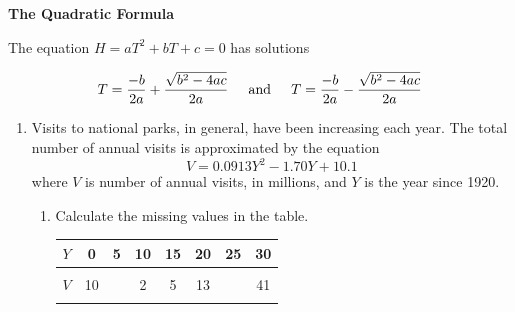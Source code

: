 \documentclass[11pt]{article}
\begin{document}
 \vspace{.2in}
 
 \begin{center}
\textbf{The Quadratic Formula}
\vspace{.1in}

The equation $H=aT^2+bT+c=0$ has solutions 


$$\displaystyle T=\frac{-b}{2a} + \frac{\sqrt{b^2-4ac}}{2a} \hspace{.2in} \text{and} \hspace{.2in}T=\frac{-b}{2a} - \frac{\sqrt{b^2-4ac}}{2a}$$

 \end{center}
\hrulefill

\newpage

\begin{enumerate}


\item Visits to national parks, in general, have been increasing each year.  The total number of annual visits is approximated by the equation $$V = 0.0913Y^2-1.70Y+10.1$$
where $V$ is number of annual visits, in millions, and $Y$ is the year since 1920.

\begin{enumerate}
\item Calculate the missing values in the table.




\begin{center}
\begin{tabular} {|c ||c |c |c |c |c |c |c |} \hline
$Y$ & \hspace{.25in}0  \hspace{.25in}   &\hspace{.25in} 5\hspace{.25in} & \hspace{.25in} 10   \hspace{.25in} &\hspace{.25in} 15  \hspace{.25in}  & \hspace{.25in}20   \hspace{.25in}  &\hspace{.25in}25  \hspace{.25in}& \hspace{.25in} 30 \hspace{.25in}  \\ \hline
&&&&&&& \\
$V$ &10 &  & 2 & 5 & 13 &   & 41  \\ 
&&&&&&& \\ \hline
\end{tabular}
\end{center}





\end{enumerate}
\end{enumerate}
\end{document}
